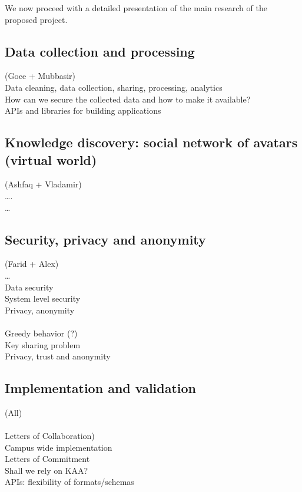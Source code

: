 We now proceed with a detailed presentation of the main research of the proposed project. 


\subsection{Data collection and processing} 
(Goce + Mubbasir)\\
Data cleaning, data collection, sharing, processing, analytics\\
How can we secure the collected data and how to make it available?\\
APIs and libraries for building applications 


 

\subsection{Knowledge discovery: social network of avatars (virtual world)}
(Ashfaq + Vladamir)\\
….\\
…\\

\subsection{Security, privacy and anonymity}
(Farid + Alex)\\
…\\
Data security\\
System level security\\
Privacy, anonymity\\
\\
Greedy behavior (?)\\
Key sharing problem\\ 
Privacy, trust and anonymity \\

\subsection{Implementation and validation }
(All)\\
\\
Letters of Collaboration)\\
Campus wide implementation \\
Letters of Commitment\\
Shall we rely on KAA?\\
APIs: flexibility of formats/schemas\\
